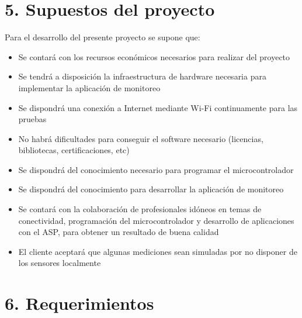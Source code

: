 \documentclass[
11pt, %
]{charter}
\begin{document}
\section{5. Supuestos del proyecto}
\label{sec:supuestos}

Para el desarrollo del presente proyecto se supone que: 
\begin{itemize}
	\item Se contará con los recursos económicos necesarios para realizar del proyecto
	\item Se tendrá a disposición la infraestructura de hardware necesaria para implementar la aplicación de monitoreo
	\item Se dispondrá una conexión a Internet mediante Wi-Fi continuamente para las pruebas
	\item No habrá dificultades para conseguir el software necesario (licencias, bibliotecas, certificaciones, etc)
	\item Se dispondrá del conocimiento necesario para programar el microcontrolador
	\item Se dispondrá del conocimiento para desarrollar la aplicación de monitoreo
	\item Se contará con la colaboración de profesionales idóneos en temas de conectividad, programación del microcontrolador y desarrollo de aplicaciones con el ASP, para obtener un resultado de buena calidad
	\item El cliente aceptará que algunas mediciones sean simuladas por no disponer de los sensores localmente
\end{itemize}

\section{6. Requerimientos}
\label{sec:requerimientos}
\end{document}
